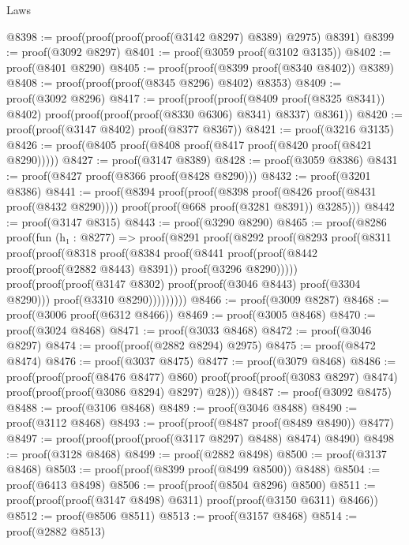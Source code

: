 \begin{lexlean}{Laws}
\begin{coremodule}
@8398 := proof(proof(proof(proof(@3142 @8297) @8389) @2975) @8391)
@8399 := proof(@3092 @8297)
@8401 := proof(@3059 proof(@3102 @3135))
@8402 := proof(@8401 @8290)
@8405 := proof(proof(@8399 proof(@8340 @8402)) @8389)
@8408 := proof(proof(proof(@8345 @8296) @8402) @8353)
@8409 := proof(@3092 @8296)
@8417 := proof(proof(proof(@8409 proof(@8325 @8341)) @8402)
      proof(proof(proof(proof(@8330 @6306) @8341) @8337) @8361))
@8420 := proof(proof(@3147 @8402) proof(@8377 @8367))
@8421 := proof(@3216 @3135)
@8426 := proof(@8405 proof(@8408 proof(@8417 proof(@8420 proof(@8421 @8290)))))
@8427 := proof(@3147 @8389)
@8428 := proof(@3059 @8386)
@8431 := proof(@8427 proof(@8366 proof(@8428 @8290)))
@8432 := proof(@3201 @8386)
@8441 := proof(@8394
      proof(proof(@8398 proof(@8426 proof(@8431 proof(@8432 @8290))))
          proof(proof(@668 proof(@3281 @8391)) @3285)))
@8442 := proof(@3147 @8315)
@8443 := proof(@3290 @8290)
@8465 := proof(@8286
      proof(fun (h₁ : @8277) =>
        proof(@8291
            proof(@8292
                proof(@8293
                    proof(@8311
                        proof(proof(@8318
                              proof(@8384
                                  proof(@8441
                                      proof(proof(@8442 proof(proof(@2882 @8443) @8391))
                                          proof(@3296 @8290)))))
                            proof(proof(proof(@3147 @8302)
                                  proof(proof(@3046 @8443) proof(@3304 @8290)))
                                proof(@3310 @8290)))))))))
@8466 := proof(@3009 @8287)
@8468 := proof(@3006 proof(@6312 @8466))
@8469 := proof(@3005 @8468)
@8470 := proof(@3024 @8468)
@8471 := proof(@3033 @8468)
@8472 := proof(@3046 @8297)
@8474 := proof(proof(@2882 @8294) @2975)
@8475 := proof(@8472 @8474)
@8476 := proof(@3037 @8475)
@8477 := proof(@3079 @8468)
@8486 := proof(proof(proof(@8476 @8477) @860)
      proof(proof(proof(@3083 @8297) @8474) proof(proof(proof(@3086 @8294) @8297) @28)))
@8487 := proof(@3092 @8475)
@8488 := proof(@3106 @8468)
@8489 := proof(@3046 @8488)
@8490 := proof(@3112 @8468)
@8493 := proof(proof(@8487 proof(@8489 @8490)) @8477)
@8497 := proof(proof(proof(proof(@3117 @8297) @8488) @8474) @8490)
@8498 := proof(@3128 @8468)
@8499 := proof(@2882 @8498)
@8500 := proof(@3137 @8468)
@8503 := proof(proof(@8399 proof(@8499 @8500)) @8488)
@8504 := proof(@6413 @8498)
@8506 := proof(proof(@8504 @8296) @8500)
@8511 := proof(proof(proof(@3147 @8498) @6311) proof(proof(@3150 @6311) @8466))
@8512 := proof(@8506 @8511)
@8513 := proof(@3157 @8468)
@8514 := proof(@2882 @8513)

\end{coremodule}
\end{lexlean}
